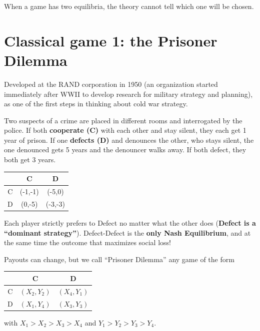 \documentclass[11pt,a4paper,openany]{book}
\begin{document}
\begin{warnbox}[title=Multiple equilibria]
When a game has two equilibria, the theory cannot tell which one will be chosen.
\end{warnbox}


\section{Classical game 1: the Prisoner Dilemma}

Developed at the RAND corporation in 1950 (an organization started immediately after WWII to
develop research for military strategy and planning), as one of the first steps in thinking
about cold war strategy.

\begin{exbox}[title=The classic story]
Two suspects of a crime are placed in different rooms and interrogated by the police. If
both \textbf{cooperate (C)} with each other and stay silent, they each get 1 year of prison.
If one \textbf{defects (D)} and denounces the other, who stays silent, the one denounced gets
5 years and the denouncer walks away. If both defect, they both get 3 years.
\begin{center}
\begin{tabular}{c|cc}
 & C & D \\ \hline
C & (-1,-1) & (-5,0) \\
D & (0,-5)  & (-3,-3)
\end{tabular}
\end{center}
\end{exbox}

\begin{keybox}[title=Why it is a dilemma]
Each player strictly prefers to Defect no matter what the other does (\textbf{Defect is a
``dominant strategy''}). Defect-Defect is the \textbf{only Nash Equilibrium}, and at the
same time the outcome that maximizes social loss!
\end{keybox}

\begin{defnbox}[title=Prisoner Dilemma (general form)]
Payouts can change, but we call ``Prisoner Dilemma'' any game of the form
\begin{center}
\begin{tabular}{c|cc}
 & C & D \\ \hline
C & $(X_2, Y_2)$ & $(X_4, Y_1)$ \\
D & $(X_1, Y_4)$ & $(X_3, Y_3)$
\end{tabular}
\end{center}
with $X_1 > X_2 > X_3 > X_4$ and $Y_1 > Y_2 > Y_3 > Y_4$.
\end{defnbox}
\end{document}
